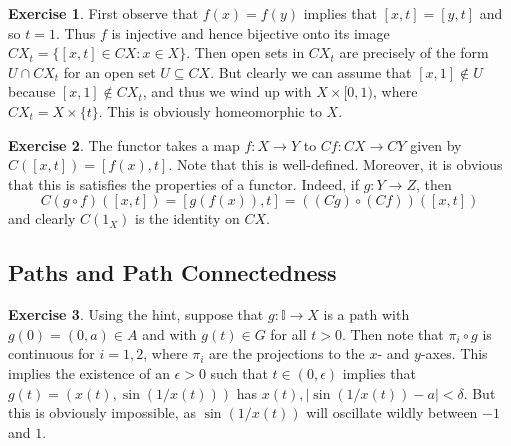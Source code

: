 \documentclass[10pt]{article}
\theoremstyle{definition}
\newtheorem{intex}{Exercise}[section]
\newenvironment{exercise}{\begin{intex}\label{\theintex}}{\end{intex}}
\newcommand*\II{\mathbb I}
\newcommand\ep{\epsilon}
\begin{document}
\begin{exercise} \leavevmode
First observe that $f(x)=f(y)$ implies that $[x,t]=[y,t]$ and so $t=1$. Thus $f$ is injective and hence bijective onto its image $CX_t=\{[x,t]\in CX:x\in X\}$. Then open sets in $CX_t$ are precisely of the form $U\cap CX_t$ for an open set $U\subseteq CX$. But clearly we can assume that $[x,1]\not\in U$ because $[x,1]\not\in CX_t$, and thus we wind up with $X\times[0,1)$, where $CX_t=X\times\{t\}$. This is obviously homeomorphic to $X$. 
\end{exercise} 

\begin{exercise} \leavevmode
The functor takes a map $f:X\to Y$ to $Cf:CX\to CY$ given by $C([x,t])=[f(x),t]$. Note that this is well-defined. Moreover, it is obvious that this is satisfies the properties of a functor. Indeed, if $g:Y\to Z$, then \[C(g\circ f)([x,t])=[g(f(x)),t]=((Cg)\circ(Cf))([x,t])\] and clearly $C(1_X)$ is the identity on $CX$. 
\end{exercise} 

\subsection{Paths and Path Connectedness} 
\begin{exercise} \leavevmode
Using the hint, suppose that $g:\II\to X$ is a path with $g(0)=(0,a)\in A$ and with $g(t)\in G$ for all $t>0$. Then note that $\pi_i\circ g$ is continuous for $i=1,2$, where $\pi_i$ are the projections to the $x$- and $y$-axes. This implies the existence of an $\ep>0$ such that $t\in(0,\ep)$ implies that $g(t)=(x(t),\sin(1/x(t)))$ has $x(t),|\sin(1/x(t))-a|<\delta$. But this is obviously impossible, as $\sin(1/x(t))$ will oscillate wildly between $-1$ and $1$. 
\end{exercise} 
\end{document}
